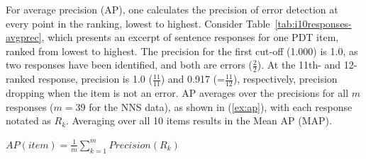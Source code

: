 For average precision (AP), one calculates the precision of error
detection at every point in the ranking, lowest to highest. Consider
Table~\ref{tab:i10responses-avgprec}, which presents an excerpt of sentence
responses for one PDT item, ranked from lowest to highest. The precision for
the first cut-off (1.000) is 1.0, as two responses have been
identified, and both are errors ($\frac{2}{2}$). At the 11th- and
12-ranked response, precision is 1.0 ($\frac{11}{11}$) and 0.917
(=$\frac{11}{12}$), respectively, precision dropping when the item is
not an error.
AP averages over the precisions for all $m$ responses ($m=39$ for the
NNS data), as shown in (\ref{ex:ap}), with each response notated as
$R_k$.  Averaging over all 10 items results in the Mean AP (MAP).

%
%

\begin{exe}
\ex\label{ex:ap} $AP(item) = \frac{1}{m} \sum\limits_{k=1}^m
Precision(R_k)$
\end{exe}



